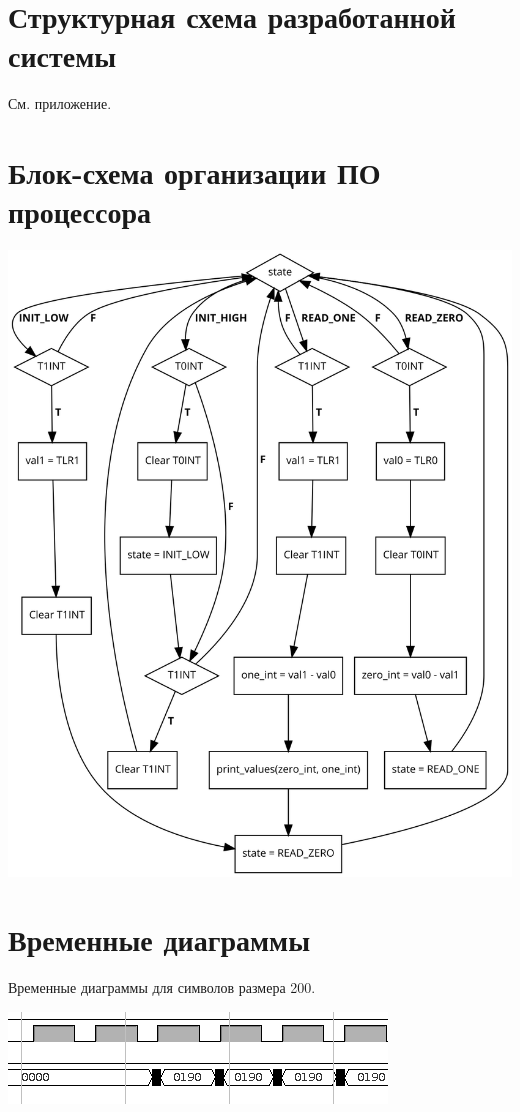 \documentclass[12pt, a4paper] {ncc}
\begin{document}
\section{Структурная схема разработанной системы}
	См. приложение.

\section{Блок-схема организации ПО процессора}

	\includegraphics[scale=0.3]{./code_flow.png}


\section{Временные диаграммы}

	Временные диаграммы для символов размера 200.

	\includegraphics[scale=0.5]{./d_400.png}
\end{document}
